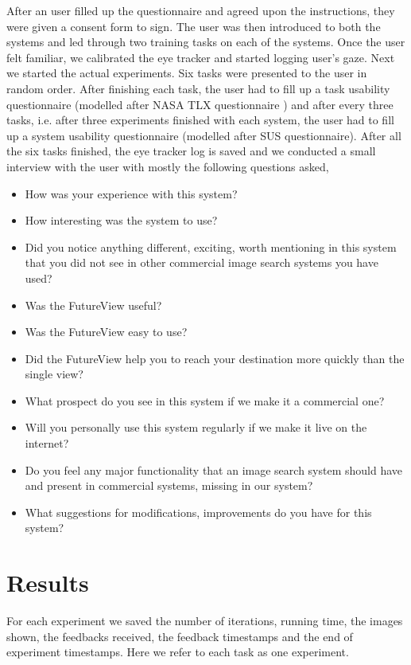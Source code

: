 \documentclass[english]{tktltiki}
\begin{document}
After an user filled up the questionnaire and agreed upon the instructions, they were given a consent form to sign. The user was then introduced to both the systems and led through two training tasks on each of the systems. Once the user felt familiar, we calibrated the eye tracker and started logging user's gaze. Next we started the actual experiments. Six tasks were presented to the user in random order. After finishing each task, the user had to fill up a task usability questionnaire (modelled after NASA TLX questionnaire \cite{NASA_TLX}) and after every three tasks, i.e. after three experiments finished with each system, the user had to fill up a system usability questionnaire (modelled after SUS questionnaire). After all the six tasks finished, the eye tracker log is saved and we conducted a small interview with the user with mostly the following questions asked,

\begin{itemize}
	\item How was your experience with this system?
	\item How interesting was the system to use?
	\item Did you notice anything different, exciting, worth mentioning in this system that you did not see in other commercial image search systems you have used?
	\item Was the FutureView useful?
	\item Was the FutureView easy to use?
	\item Did the FutureView help you to reach your destination more quickly than the single view?
	\item What prospect do you see in this system if we make it a commercial one?
	\item Will you personally use this system regularly if we make it live on the internet?
	\item Do you feel any major functionality that an image search system should have and present in commercial systems, missing in our system?
	\item What suggestions for modifications, improvements do you have for this system?
\end{itemize}

\section{Results}

For each experiment we saved the number of iterations, running time, the images shown, the feedbacks received, the feedback timestamps and the end of experiment timestamps. Here we refer to each task as one experiment.
\end{document}

